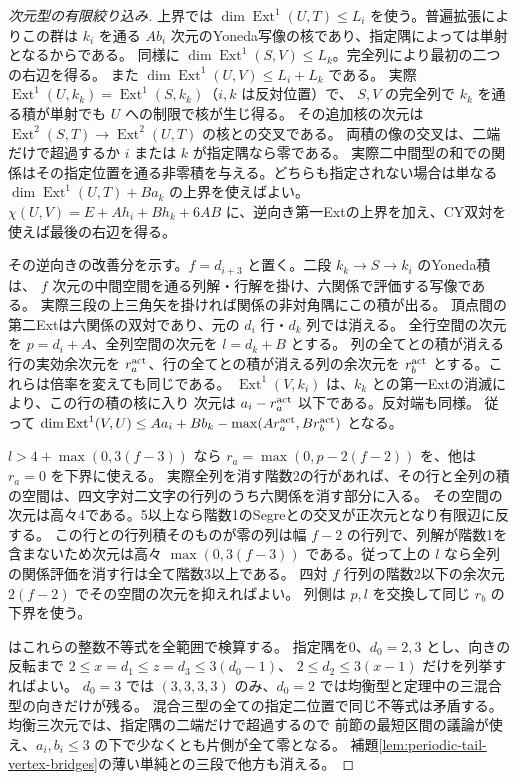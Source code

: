 \begin{proof}[次元型の有限絞り込み]
上界では $\dim\operatorname{Ext}^1(U,T)\le L_i$ を使う。普遍拡張によりこの群は
$k_i$ を通る $A b_i$ 次元のYoneda写像の核であり、指定隅によっては単射となるからである。
同様に $\dim\operatorname{Ext}^1(S,V)\le L_k$。完全列により最初の二つの右辺を得る。
また $\dim\operatorname{Ext}^1(U,V)\le L_i+L_k$ である。
実際 $\operatorname{Ext}^1(U,k_k)=\operatorname{Ext}^1(S,k_k)$（$i,k$ は反対位置）で、
$S,V$ の完全列で $k_k$ を通る積が単射でも $U$ への制限で核が生じ得る。
その追加核の次元は $\operatorname{Ext}^2(S,T)\to\operatorname{Ext}^2(U,T)$ の核との交叉である。
両積の像の交叉は、二端だけで超過するか $i$ または $k$ が指定隅なら零である。
実際二中間型の和での関係はその指定位置を通る非零積を与える。どちらも指定されない場合は単なる
$\dim\operatorname{Ext}^1(U,T)+B a_k$ の上界を使えばよい。
$\chi(U,V)=E+A h_i+B h_k+6AB$ に、逆向き第一Extの上界を加え、CY双対を使えば最後の右辺を得る。

その逆向きの改善分を示す。$f=d_{i+3}$ と置く。二段 $k_k\to S\to k_i$ のYoneda積は、
$f$ 次元の中間空間を通る列解・行解を掛け、六関係で評価する写像である。
実際三段の上三角矢を掛ければ関係の非対角隅にこの積が出る。
頂点間の第二Extは六関係の双対であり、元の $d_i$ 行・$d_k$ 列では消える。
全行空間の次元を $p=d_i+A$、全列空間の次元を $l=d_k+B$ とする。
列の全てとの積が消える行の実効余次元を $r_a^{\rm act}$、行の全てとの積が消える列の余次元を
$r_b^{\rm act}$ とする。これらは倍率を変えても同じである。
$\operatorname{Ext}^1(V,k_i)$ は、$k_k$ との第一Extの消滅により、この行の積の核に入り
次元は $a_i-r_a^{\rm act}$ 以下である。反対端も同様。
従って $\dim\operatorname{Ext}^1(V,U)\le A a_i+B b_k-\max(A r_a^{\rm act},B r_b^{\rm act})$ となる。

$l>4+\max(0,3(f-3))$ なら $r_a=\max(0,p-2(f-2))$ を、他は $r_a=0$ を下界に使える。
実際全列を消す階数2の行があれば、その行と全列の積の空間は、四文字対二文字の行列のうち六関係を消す部分に入る。
その空間の次元は高々4である。5以上なら階数1のSegreとの交叉が正次元となり有限辺に反する。
この行との行列積そのものが零の列は幅 $f-2$ の行列で、列解が階数1を含まないため次元は高々
$\max(0,3(f-3))$ である。従って上の $l$ なら全列の関係評価を消す行は全て階数3以上である。
四対 $f$ 行列の階数2以下の余次元 $2(f-2)$ でその空間の次元を抑えればよい。
列側は $p,l$ を交換して同じ $r_b$ の下界を使う。

 はこれらの整数不等式を全範囲で検算する。
指定隅を0、$d_0=2,3$ とし、向きの反転まで $2\le x=d_1\le z=d_3\le3(d_0-1)$、
$2\le d_2\le3(x-1)$ だけを列挙すればよい。
$d_0=3$ では $(3,3,3,3)$ のみ、$d_0=2$ では均衡型と定理中の三混合型の向きだけが残る。
混合三型の全ての指定二位置で同じ不等式は矛盾する。均衡三次元では、指定隅の二端だけで超過するので
前節の最短区間の議論が使え、$a_i,b_i\le3$ の下で少なくとも片側が全て零となる。
補題\ref{lem:periodic-tail-vertex-bridges}の薄い単純との三段で他方も消える。
\end{proof}

